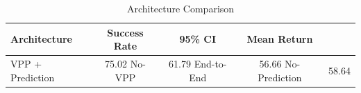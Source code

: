 \begin{table}[t]
\centering
\caption{Architecture Comparison}
\label{tab:architecture_comparison}
\begin{tabular}{lccc}
\toprule
Architecture & Success Rate & 95\% CI & Mean Return \\
\midrule
VPP + Prediction & 75.02%
No-VPP & 61.79%
End-to-End & 56.66%
No-Prediction & 58.64%
\bottomrule
\end{tabular}
\end{table}
